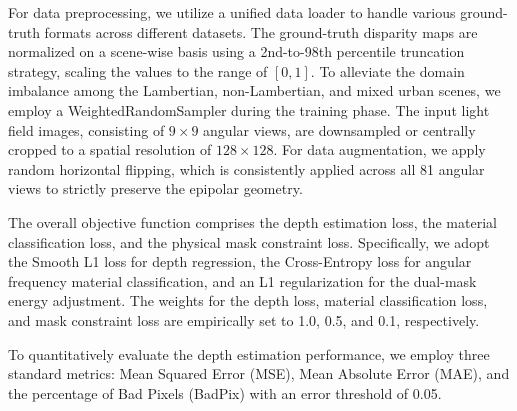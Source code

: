 \documentclass[lettersize,journal]{IEEEtran}
\begin{document}
\begin{table}[htbp]
\centering
\caption{Summary of Key Hyperparameters and Training Settings}
\label{tab:hyperparameters}
\end{table}

For data preprocessing, we utilize a unified data loader to handle various ground-truth formats across different datasets. The ground-truth disparity maps are normalized on a scene-wise basis using a 2nd-to-98th percentile truncation strategy, scaling the values to the range of $[0, 1]$. To alleviate the domain imbalance among the Lambertian, non-Lambertian, and mixed urban scenes, we employ a WeightedRandomSampler during the training phase. The input light field images, consisting of $9 \times 9$ angular views, are downsampled or centrally cropped to a spatial resolution of $128 \times 128$. For data augmentation, we apply random horizontal flipping, which is consistently applied across all 81 angular views to strictly preserve the epipolar geometry.

The overall objective function comprises the depth estimation loss, the material classification loss, and the physical mask constraint loss. Specifically, we adopt the Smooth L1 loss for depth regression, the Cross-Entropy loss for angular frequency material classification, and an L1 regularization for the dual-mask energy adjustment. The weights for the depth loss, material classification loss, and mask constraint loss are empirically set to 1.0, 0.5, and 0.1, respectively.

To quantitatively evaluate the depth estimation performance, we employ three standard metrics: Mean Squared Error (MSE), Mean Absolute Error (MAE), and the percentage of Bad Pixels (BadPix) with an error threshold of 0.05.
\end{document}
